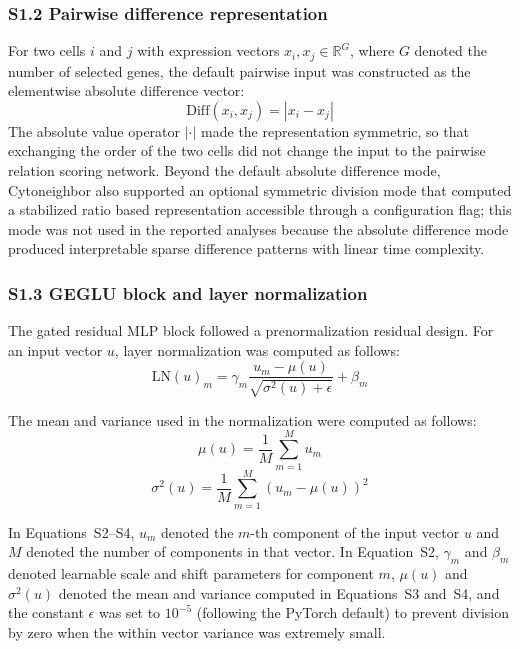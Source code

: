 \documentclass[11pt]{article}
\begin{document}
\subsubsection*{S1.2 Pairwise difference representation}

For two cells \(i\) and \(j\) with expression vectors \(x_i, x_j \in \mathbb{R}^{G}\), where \(G\) denoted the number of selected genes, the default pairwise input was constructed as the elementwise absolute difference vector:
\begin{equation}
\mathrm{Diff}(x_i, x_j) = |x_i - x_j|
\label{eq:supp_diff}
\end{equation}
The absolute value operator \(|\cdot|\) made the representation symmetric, so that exchanging the order of the two cells did not change the input to the pairwise relation scoring network. Beyond the default absolute difference mode, Cytoneighbor also supported an optional symmetric division mode that computed a stabilized ratio based representation accessible through a configuration flag; this mode was not used in the reported analyses because the absolute difference mode produced interpretable sparse difference patterns with linear time complexity.

\subsubsection*{S1.3 GEGLU block and layer normalization}

The gated residual MLP block followed a prenormalization residual design. For an input vector \(u\), layer normalization was computed as follows:
\begin{equation}
\mathrm{LN}(u)_m = \gamma_m \frac{u_m - \mu(u)}{\sqrt{\sigma^2(u) + \epsilon}} + \beta_m
\label{eq:layer_norm}
\end{equation}

The mean and variance used in the normalization were computed as follows:
\begin{equation}
\mu(u) = \frac{1}{M}\sum_{m=1}^{M} u_m
\label{eq:layer_norm_mean}
\end{equation}
\begin{equation}
\sigma^2(u) = \frac{1}{M}\sum_{m=1}^{M}\left(u_m - \mu(u)\right)^2
\label{eq:layer_norm_variance}
\end{equation}

In Equations~S2--S4, \(u_m\) denoted the \(m\)-th component of the input vector \(u\) and \(M\) denoted the number of components in that vector. In Equation~S2, \(\gamma_m\) and \(\beta_m\) denoted learnable scale and shift parameters for component \(m\), \(\mu(u)\) and \(\sigma^2(u)\) denoted the mean and variance computed in Equations~S3 and~S4, and the constant \(\epsilon\) was set to \(10^{-5}\) (following the PyTorch default) to prevent division by zero when the within vector variance was extremely small.
\end{document}
